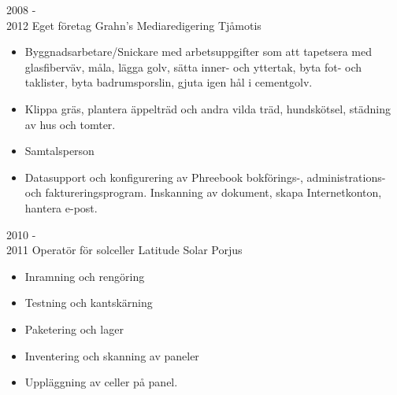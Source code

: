 \documentclass[a4paper]{twentysecondcv} %
\begin{document}
\begin{twenty}
	\twentyitem
    {2008 - \\ 2012}
    {Eget företag}
    {Grahn's Mediaredigering}
    {Tjåmotis}
    {
    \begin{itemize}
    	\item Byggnadsarbetare/Snickare med arbetsuppgifter som att tapetsera med
        glasfiberväv, måla, lägga golv, sätta inner- och yttertak, byta fot- och
        taklister, byta  badrumsporslin, gjuta igen hål i cementgolv.
        \item Klippa gräs, plantera äppelträd och andra vilda träd, hundskötsel, städning
        av hus och tomter.
    	\item Samtalsperson
    	\item Datasupport och konfigurering av Phreebook bokförings-, administrations-
        och faktureringsprogram. Inskanning av dokument, skapa Internetkonton, hantera
        e-post.
    \end{itemize}
    }
    \twentyitem
    {2010 - \\ 2011}
    {Operatör för solceller}
    {Latitude Solar}
    {Porjus}
    {
    \begin{itemize}
    	\item Inramning och rengöring
        \item Testning och kantskärning
        \item Paketering och lager
        \item Inventering och skanning av paneler
        \item Uppläggning av celler på panel.
    \end{itemize}
    }

\end{twenty}



\end{document}
